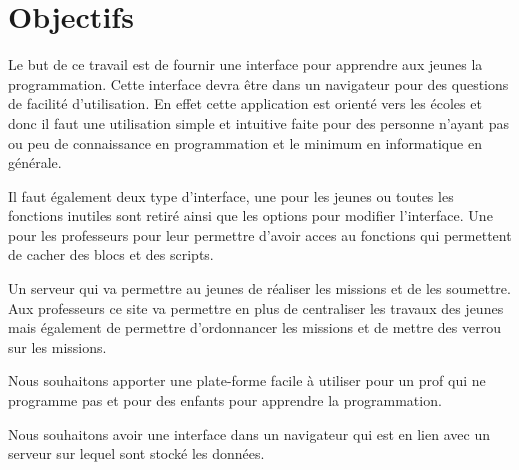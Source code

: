 \section{Objectifs}
\label{intro-objectifs}
Le but de ce travail est de fournir une interface pour apprendre aux jeunes la programmation. Cette interface devra être dans un navigateur pour des questions de facilité d'utilisation. En effet cette application est orienté vers les écoles et donc il faut une utilisation simple et intuitive faite pour des personne n'ayant pas ou peu de connaissance en programmation et le minimum en informatique en générale.

Il faut également deux type d'interface, une pour les jeunes ou toutes les fonctions inutiles sont retiré ainsi que les options pour modifier l'interface. Une pour les professeurs pour leur permettre d'avoir acces au fonctions qui permettent de cacher des blocs et des scripts.

Un serveur qui va permettre au jeunes de réaliser les missions et de les soumettre. Aux professeurs ce site va permettre en plus de centraliser les travaux des jeunes mais également de permettre d'ordonnancer les missions et de mettre des verrou sur les missions.


Nous souhaitons apporter une plate-forme facile à utiliser pour un prof qui ne programme pas et pour des enfants pour apprendre la programmation. 

Nous souhaitons avoir une interface dans un navigateur qui est en lien avec un serveur sur lequel sont stocké les données.
